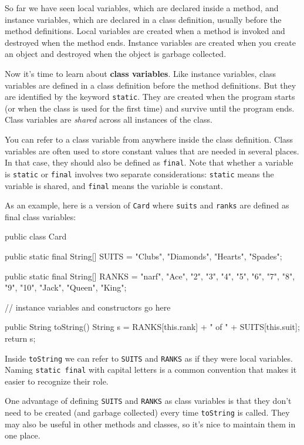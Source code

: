 \documentclass[12pt]{book}
\theoremstyle{exercise}
\newcommand{\java}[1]{\verb"#1"}
\newcommand{\java}[1]{\lstinline{#1}} %
\begin{document}
So far we have seen local variables, which are declared inside a method, and instance variables, which are declared in a class definition, usually before the method definitions.
Local variables are created when a method is invoked and destroyed when the method ends.
Instance variables are created when you create an object and destroyed when the object is garbage collected.


Now it's time to learn about {\bf class variables}.
Like instance variables, class variables are defined in a class definition before the method definitions.
But they are identified by the keyword \java{static}.
They are created when the program starts (or when the class is used for the first time) and survive until the program ends.
Class variables are {\em shared} across all instances of the class.

You can refer to a class variable from anywhere inside the class definition.
Class variables are often used to store constant values that are needed in several places.
In that case, they should also be defined as \java{final}.
Note that whether a variable is \java{static} or \java{final} involves two separate considerations:
\java{static} means the variable is shared, and \java{final} means the variable is constant.

As an example, here is a version of \java{Card} where \java{suits} and \java{ranks} are defined as final class variables:

\begin{code}
public class Card {

    public static final String[] SUITS = {
        "Clubs", "Diamonds", "Hearts", "Spades"};

    public static final String[] RANKS = {
        "narf", "Ace", "2", "3", "4", "5", "6", "7", "8", "9",
        "10", "Jack", "Queen", "King"};

    // instance variables and constructors go here

    public String toString() {
        String s = RANKS[this.rank] + " of " + SUITS[this.suit];
        return s;
    }
}
\end{code}

Inside \java{toString} we can refer to \java{SUITS} and \java{RANKS} as if they were local variables.
Naming \java{static final} with capital letters is a common convention that makes it easier to recognize their role.

One advantage of defining \java{SUITS} and \java{RANKS} as class variables is that they don't need to be created (and garbage collected) every time \java{toString} is called.
They may also be useful in other methods and classes, so it's nice to maintain them in one place.
\end{document}
